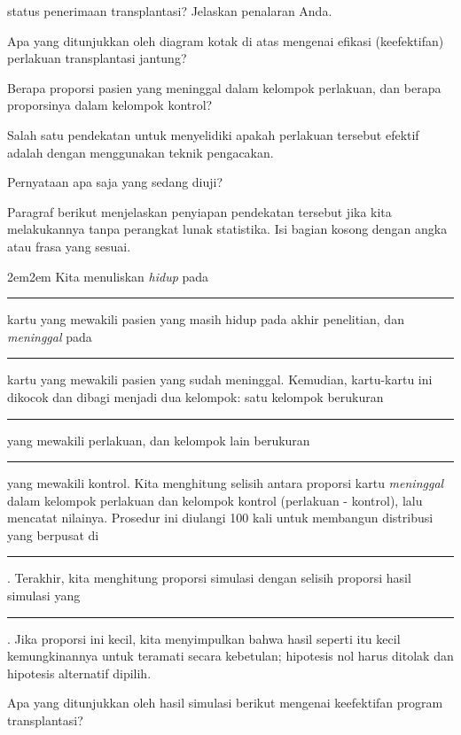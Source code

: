{\begin{parts}
status penerimaan transplantasi? Jelaskan penalaran Anda.
\item Apa yang ditunjukkan oleh diagram kotak di atas mengenai efikasi
(keefektifan) perlakuan transplantasi jantung?
\item Berapa proporsi pasien yang meninggal dalam kelompok perlakuan, dan berapa
proporsinya dalam kelompok kontrol?
\item Salah satu pendekatan untuk menyelidiki apakah perlakuan tersebut efektif
adalah dengan menggunakan teknik pengacakan.
\begin{subparts}
\item Pernyataan apa saja yang sedang diuji?
\item Paragraf berikut menjelaskan penyiapan pendekatan tersebut jika kita
melakukannya tanpa perangkat lunak statistika. Isi bagian kosong dengan angka
atau frasa yang sesuai.
\begin{adjustwidth}{2em}{2em}
Kita menuliskan \textit{hidup} pada \rule{2cm}{0.5pt} kartu yang mewakili pasien
yang masih hidup pada akhir penelitian, dan \textit{meninggal} pada
\rule{2cm}{0.5pt} kartu yang mewakili pasien yang sudah meninggal. Kemudian,
kartu-kartu ini dikocok dan dibagi menjadi dua kelompok: satu kelompok berukuran
\rule{2cm}{0.5pt} yang mewakili perlakuan, dan kelompok lain berukuran
\rule{2cm}{0.5pt} yang mewakili kontrol. Kita menghitung selisih antara proporsi
kartu \textit{meninggal} dalam kelompok perlakuan dan kelompok kontrol
(perlakuan - kontrol), lalu mencatat nilainya. Prosedur ini diulangi 100 kali
untuk membangun distribusi yang berpusat di \rule{2cm}{0.5pt}. Terakhir, kita
menghitung proporsi simulasi dengan selisih proporsi hasil simulasi yang
\rule{2cm}{0.5pt}. Jika proporsi ini kecil, kita menyimpulkan bahwa hasil
seperti itu kecil kemungkinannya untuk teramati secara kebetulan; hipotesis nol
harus ditolak dan hipotesis alternatif dipilih.
\end{adjustwidth}
\item Apa yang ditunjukkan oleh hasil simulasi berikut mengenai keefektifan
program transplantasi?
\end{subparts}
\end{parts}
\begin{center}
\end{center}
}{}
